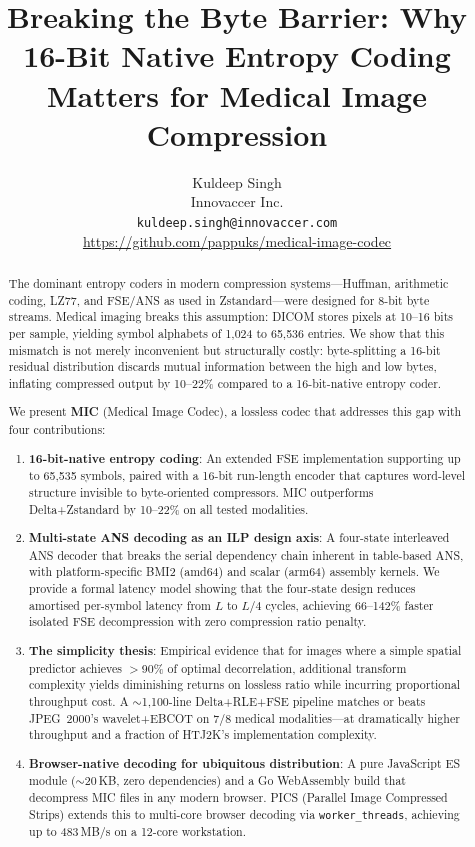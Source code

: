 \documentclass[10pt,twocolumn]{article}
\title{\textbf{Breaking the Byte Barrier: Why 16-Bit Native Entropy Coding\\Matters for Medical Image Compression}}
\author{
  Kuldeep Singh\\
  Innovaccer Inc.\\
  \texttt{kuldeep.singh@innovaccer.com}\\
  \url{https://github.com/pappuks/medical-image-codec}
}
\date{}
\begin{document}
\maketitle

\begin{abstract}
The dominant entropy coders in modern compression systems---Huffman,
arithmetic coding, LZ77, and FSE/ANS as used in Zstandard---were designed for
8-bit byte streams. Medical imaging breaks this assumption: DICOM stores pixels
at 10--16 bits per sample, yielding symbol alphabets of 1,024 to 65,536
entries. We show that this mismatch is not merely inconvenient but structurally
costly: byte-splitting a 16-bit residual distribution discards mutual
information between the high and low bytes, inflating compressed output by
10--22\% compared to a 16-bit-native entropy coder.

We present \textbf{MIC} (Medical Image Codec), a lossless codec that addresses
this gap with four contributions:
\begin{enumerate}
  \item \textbf{16-bit-native entropy coding}: An extended FSE implementation
  supporting up to 65,535 symbols, paired with a 16-bit run-length encoder that
  captures word-level structure invisible to byte-oriented compressors. MIC
  outperforms Delta+Zstandard by 10--22\% on all tested modalities.

  \item \textbf{Multi-state ANS decoding as an ILP design axis}: A four-state
  interleaved ANS decoder that breaks the serial dependency chain inherent in
  table-based ANS, with platform-specific BMI2 (amd64) and scalar (arm64)
  assembly kernels. We provide a formal latency model showing that the four-state
  design reduces amortised per-symbol latency from $L$ to $L/4$ cycles,
  achieving 66--142\% faster isolated FSE decompression with zero compression
  ratio penalty.

  \item \textbf{The simplicity thesis}: Empirical evidence that for images where
  a simple spatial predictor achieves $>$90\% of optimal decorrelation,
  additional transform complexity yields diminishing returns on lossless ratio
  while incurring proportional throughput cost. A $\sim$1,100-line
  Delta+RLE+FSE pipeline matches or beats JPEG~2000's wavelet+EBCOT on 7/8
  medical modalities---at dramatically higher throughput and a fraction of
  HTJ2K's implementation complexity.

  \item \textbf{Browser-native decoding for ubiquitous distribution}: A pure
  JavaScript ES module ($\sim$20\,KB, zero dependencies) and a Go WebAssembly
  build that decompress MIC files in any modern browser. PICS (Parallel Image
  Compressed Strips) extends this to multi-core browser decoding via
  \texttt{worker\_threads}, achieving up to 483\,MB/s on a 12-core workstation.
\end{enumerate}


\end{abstract}
\end{document}
